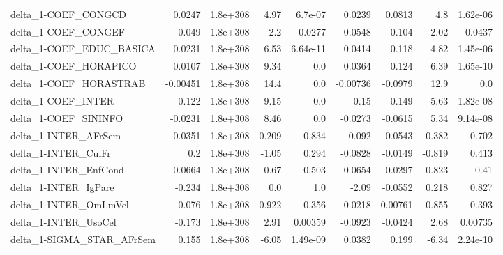 \begin{tabular}{lrrrrrrrr}
delta\_1-COEF\_CONGCD                   &      0.0247 &     1.8e+308 &     4.97 &  6.7e-07 &     0.0239 &      0.0813 &          4.8 &      1.62e-06 \\
delta\_1-COEF\_CONGEF                   &       0.049 &     1.8e+308 &      2.2 &   0.0277 &     0.0548 &       0.104 &         2.02 &        0.0437 \\
delta\_1-COEF\_EDUC\_BASICA              &      0.0231 &     1.8e+308 &     6.53 & 6.64e-11 &     0.0414 &       0.118 &         4.82 &      1.45e-06 \\
delta\_1-COEF\_HORAPICO                 &      0.0107 &     1.8e+308 &     9.34 &      0.0 &     0.0364 &       0.124 &         6.39 &      1.65e-10 \\
delta\_1-COEF\_HORASTRAB                &    -0.00451 &     1.8e+308 &     14.4 &      0.0 &   -0.00736 &     -0.0979 &         12.9 &           0.0 \\
delta\_1-COEF\_INTER                    &      -0.122 &     1.8e+308 &     9.15 &      0.0 &      -0.15 &      -0.149 &         5.63 &      1.82e-08 \\
delta\_1-COEF\_SININFO                  &     -0.0231 &     1.8e+308 &     8.46 &      0.0 &    -0.0273 &     -0.0615 &         5.34 &      9.14e-08 \\
delta\_1-INTER\_AFrSem                  &      0.0351 &     1.8e+308 &    0.209 &    0.834 &      0.092 &      0.0543 &        0.382 &         0.702 \\
delta\_1-INTER\_CulFr                   &         0.2 &     1.8e+308 &    -1.05 &    0.294 &    -0.0828 &     -0.0149 &       -0.819 &         0.413 \\
delta\_1-INTER\_EnfCond                 &     -0.0664 &     1.8e+308 &     0.67 &    0.503 &    -0.0654 &     -0.0297 &        0.823 &          0.41 \\
delta\_1-INTER\_IgPare                  &      -0.234 &     1.8e+308 &      0.0 &      1.0 &      -2.09 &     -0.0552 &        0.218 &         0.827 \\
delta\_1-INTER\_OmLmVel                 &      -0.076 &     1.8e+308 &    0.922 &    0.356 &     0.0218 &     0.00761 &        0.855 &         0.393 \\
delta\_1-INTER\_UsoCel                  &      -0.173 &     1.8e+308 &     2.91 &  0.00359 &    -0.0923 &     -0.0424 &         2.68 &       0.00735 \\
delta\_1-SIGMA\_STAR\_AFrSem             &       0.155 &     1.8e+308 &    -6.05 & 1.49e-09 &     0.0382 &       0.199 &        -6.34 &      2.24e-10 \\

\end{tabular}
